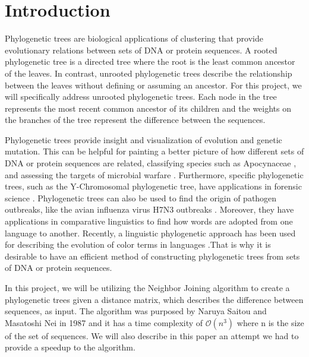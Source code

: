 \section{Introduction}

Phylogenetic trees are biological applications of clustering that provide evolutionary relations between sets of DNA or protein sequences. A rooted phylogenetic tree is a directed tree where the root is the least common ancestor of the leaves. In contrast, unrooted phylogenetic trees describe the relationship between the leaves without defining or assuming an ancestor. For this project, we will specifically address unrooted phylogenetic trees. Each node in the tree represents the most recent common ancestor of its children and the weights on the branches of the tree represent the difference between the sequences.

Phylogenetic trees provide insight and visualization of evolution and genetic mutation. This can be helpful for painting a better picture of how different sets of DNA or protein sequences are related, classifying species such as Apocynaceae \cite{sennblad2002}, and assessing the targets of microbial warfare \cite{riley2003}. Furthermore, specific phylogenetic trees, such as the Y-Chromosomal phylogenetic tree, have applications in forensic science \cite{van2013}. Phylogenetic trees can also be used to find the origin of pathogen outbreaks, like the avian influenza virus H7N3 outbreaks \cite{lu2014}. Moreover, they have applications in comparative linguistics to find how words are adopted from one language to another. Recently, a linguistic phylogenetic approach has been used for describing the evolution of color terms in languages \cite{haynie2016}.That is why it is desirable to have an efficient method of constructing phylogenetic trees from sets of DNA or protein sequences.

In this project, we will be utilizing the Neighbor Joining algorithm to create a phylogenetic trees given a distance matrix, which describes the difference between sequences, as input. The algorithm was purposed by Naruya Saitou and Masatoshi Nei in 1987 \cite{saitou1987neighbor} and it has a time complexity of $\mathcal{O}(n^3)$ where n is the size of the set of sequences. We will also describe in this paper an attempt we had to provide a speedup to the algorithm.
